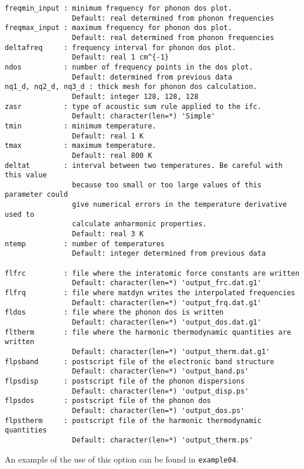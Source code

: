 \documentclass[12pt,a4paper]{article}
\begin{document}
\begin{verbatim}
freqmin_input : minimum frequency for phonon dos plot.
                Default: real determined from phonon frequencies
freqmax_input : maximum frequency for phonon dos plot.
                Default: real determined from phonon frequencies
deltafreq     : frequency interval for phonon dos plot.
                Default: real 1 cm^{-1}
ndos          : number of frequency points in the dos plot.
                Default: determined from previous data
nq1_d, nq2_d, nq3_d : thick mesh for phonon dos calculation.
                Default: integer 128, 128, 128
zasr          : type of acoustic sum rule applied to the ifc.
                Default: character(len=*) 'Simple'
tmin          : minimum temperature.
                Default: real 1 K
tmax          : maximum temperature.
                Default: real 800 K
deltat        : interval between two temperatures. Be careful with this value
                because too small or too large values of this parameter could 
                give numerical errors in the temperature derivative used to 
                calculate anharmonic properties.
                Default: real 3 K
ntemp         : number of temperatures
                Default: integer determined from previous data

flfrc         : file where the interatomic force constants are written
                Default: character(len=*) 'output_frc.dat.g1'
flfrq         : file where matdyn writes the interpolated frequencies
                Default: character(len=*) 'output_frq.dat.g1'
fldos         : file where the phonon dos is written
                Default: character(len=*) 'output_dos.dat.g1'
fltherm       : file where the harmonic thermodynamic quantities are written
                Default: character(len=*) 'output_therm.dat.g1'
flpsband      : postscript file of the electronic band structure
                Default: character(len=*) 'output_band.ps'
flpsdisp      : postscript file of the phonon dispersions
                Default: character(len=*) 'output_disp.ps'
flpsdos       : postscript file of the phonon dos
                Default: character(len=*) 'output_dos.ps'
flpstherm     : postscript file of the harmonic thermodynamic quantities
                Default: character(len=*) 'output_therm.ps'
\end{verbatim}
An example of the use of this option can be found in \texttt{example04}.
\end{document}
